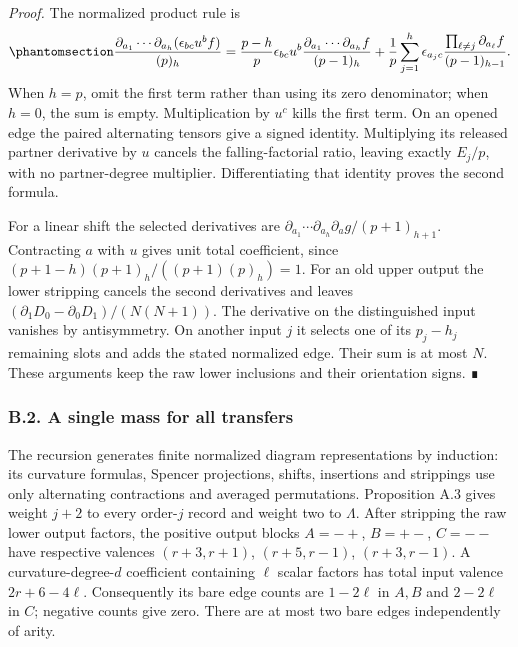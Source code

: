 \documentclass[
  english,
  11pt,
  reqno]{amsart}
\begin{document}
\emph{Proof.} The normalized product rule is
\begin{equation}\protect\phantomsection\label{eq:gg-budget-normalized-product}{
 \frac{\partial_{a_1}\cdots\partial_{a_h}
                    (\epsilon_{bc}u^bf)}{(p)_h}
 =\frac{p-h}{p}\epsilon_{bc}u^b
          \frac{\partial_{a_1}\cdots\partial_{a_h}f}{(p-1)_h}
 +\frac1p\sum_{j=1}^h\epsilon_{a_jc}
       \frac{\prod_{\ell\ne j}\partial_{a_\ell}f}{(p-1)_{h-1}} .
}\end{equation} When \(h=p\), omit the first term rather than using its
zero denominator; when \(h=0\), the sum is empty. Multiplication by
\(u^c\) kills the first term. On an opened edge the paired alternating
tensors give a signed identity. Multiplying its released partner
derivative by \(u\) cancels the falling-factorial ratio, leaving exactly
\(E_j/p\), with no partner-degree multiplier. Differentiating that
identity proves the second formula.

For a linear shift the selected derivatives are
\(\partial_{a_1}\cdots\partial_{a_h}\partial_ag/(p+1)_{h+1}\).
Contracting \(a\) with \(u\) gives unit total coefficient, since
\((p+1-h)(p+1)_h/((p+1)(p)_h)=1\). For an old upper output the lower
stripping cancels the second derivatives and leaves
\((\partial_1D_0-\partial_0D_1)/(N(N+1))\). The derivative on the
distinguished input vanishes by antisymmetry. On another input \(j\) it
selects one of its \(p_j-h_j\) remaining slots and adds the stated
normalized edge. Their sum is at most \(N\). These arguments keep the
raw lower inclusions and their orientation signs. ∎

\protect{}\label{sec:gg-budget-mass}

\subsubsection{B.2. A single mass for all
transfers}\label{b.2.-a-single-mass-for-all-transfers}

The recursion generates finite normalized diagram representations by
induction: its curvature formulas, Spencer projections, shifts,
insertions and strippings use only alternating contractions and averaged
permutations. Proposition A.3 gives weight \(j+2\) to every order-\(j\)
record and weight two to \(\Lambda\). After stripping the raw lower
output factors, the positive output blocks \(A=-+\), \(B=+-\), \(C=--\)
have respective valences \((r+3,r+1)\), \((r+5,r-1)\), \((r+3,r-1)\). A
curvature-degree-\(d\) coefficient containing \(\ell\) scalar factors
has total input valence \(2r+6-4\ell\). Consequently its bare edge
counts are \(1-2\ell\) in \(A,B\) and \(2-2\ell\) in \(C\); negative
counts give zero. There are at most two bare edges independently of
arity.
\end{document}
